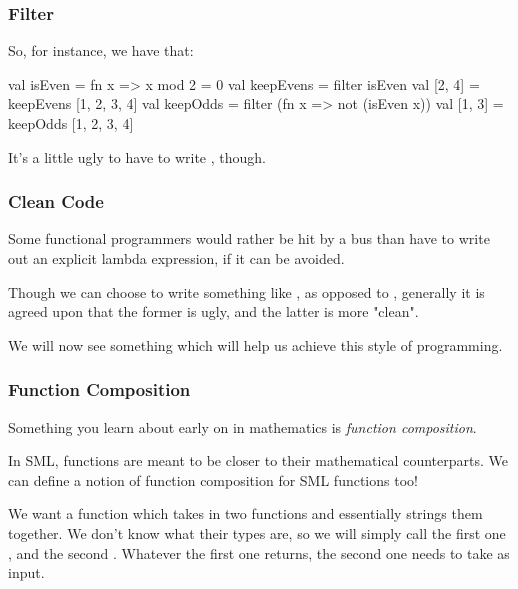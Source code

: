 \documentclass[aspectratio=169]{beamer}
\begin{document}
\begin{frame}[fragile]
  \frametitle{Filter}

  So, for instance, we have that:

  \pause
  \begin{codeblock}
    val isEven = fn x => x mod 2 = 0
    val keepEvens = filter isEven
    val [2, 4] = keepEvens [1, 2, 3, 4]
    val keepOdds = filter (fn x => not (isEven x))
    val [1, 3] = keepOdds [1, 2, 3, 4]
  \end{codeblock}

  \pause
  \vspace{\fill}

  It's a little ugly to have to write , though.
\end{frame}

\begin{frame}[fragile]
  \frametitle{Clean Code}

  Some functional programmers would rather be hit by a bus than have to write
  out an explicit lambda expression, if it can be avoided.

  \pause
  \vspace{\fill}

  Though we can choose to write something like
  , as opposed to , generally
  it is agreed upon that the former is ugly, and the latter is more "clean".

  \pause
  \vspace{\fill}

  We will now see something which will help us achieve this style of programming.
\end{frame}

\begin{frame}[fragile]
  \frametitle{Function Composition}

  Something you learn about early on in mathematics is \textit{function composition}.

  \pause
  \vspace{\fill}

  In SML, functions are meant to be closer to their mathematical counterparts. We
  can define a notion of function composition for SML functions too!

  \pause
  \vspace{\fill}

  We want a function which takes in two functions and essentially strings them
  together. We don't know what their types are, so we will simply call the first
  one , and the second . Whatever the first one
  returns, the second one needs to take as input.
\end{frame}
\end{document}
